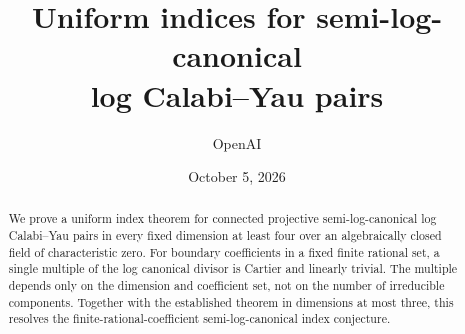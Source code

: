 \documentclass[11pt]{article}
\title{Uniform indices for semi-log-canonical\\log Calabi--Yau pairs}
\author{OpenAI}
\date{October 5, 2026}
\numberwithin{equation}{section}
\theoremstyle{definition}
\theoremstyle{remark}
\begin{document}
\maketitle
\begin{abstract}
We prove a uniform index theorem for connected projective semi-log-canonical
log Calabi--Yau pairs in every fixed dimension at least four over an
algebraically closed field of characteristic zero. For boundary coefficients
in a fixed finite rational set, a single multiple of the log canonical divisor
is Cartier and linearly trivial. The multiple depends only on the dimension
and coefficient set, not on the number of irreducible components. Together
with the established theorem in dimensions at most three, this resolves the
finite-rational-coefficient semi-log-canonical index conjecture.
\end{abstract}
\setcounter{tocdepth}{1}
\tableofcontents
\clearpage









\end{document}
